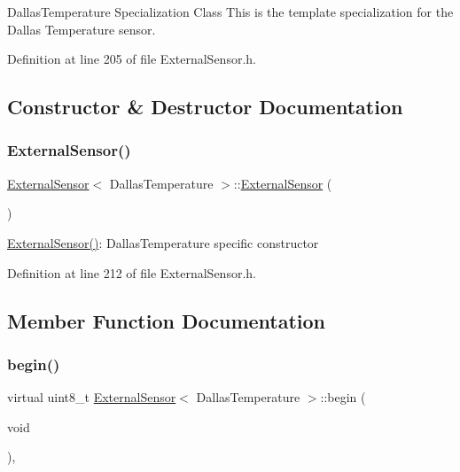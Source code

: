 Dallas\+Temperature Specialization Class This is the template specialization for the Dallas Temperature sensor. 

Definition at line 205 of file External\+Sensor.\+h.



\subsection{Constructor \& Destructor Documentation}
\mbox{\label{class_external_sensor_3_01_dallas_temperature_01_4_ad290681e8780cdf1870416eee99d699d}} 
\subsubsection{\texorpdfstring{External\+Sensor()}{ExternalSensor()}}
{\footnotesize\ttfamily \hyperlink{class_external_sensor}{External\+Sensor}$<$ Dallas\+Temperature $>$\+::\hyperlink{class_external_sensor}{External\+Sensor} (\begin{DoxyParamCaption}{ }\end{DoxyParamCaption})\hspace{0.3cm}{\ttfamily [inline]}}

\hyperlink{class_external_sensor_3_01_dallas_temperature_01_4_ad290681e8780cdf1870416eee99d699d}{External\+Sensor()}\+: Dallas\+Temperature specific constructor 

Definition at line 212 of file External\+Sensor.\+h.



\subsection{Member Function Documentation}
\mbox{\label{class_external_sensor_3_01_dallas_temperature_01_4_ac5275129b05e2ff8df45d5b222a661d9}} 
\subsubsection{\texorpdfstring{begin()}{begin()}}
{\footnotesize\ttfamily virtual uint8\+\_\+t \hyperlink{class_external_sensor}{External\+Sensor}$<$ Dallas\+Temperature $>$\+::begin (\begin{DoxyParamCaption}\item[{void}]{ }\end{DoxyParamCaption})\hspace{0.3cm}{\ttfamily [inline]}, {\ttfamily [virtual]}}

